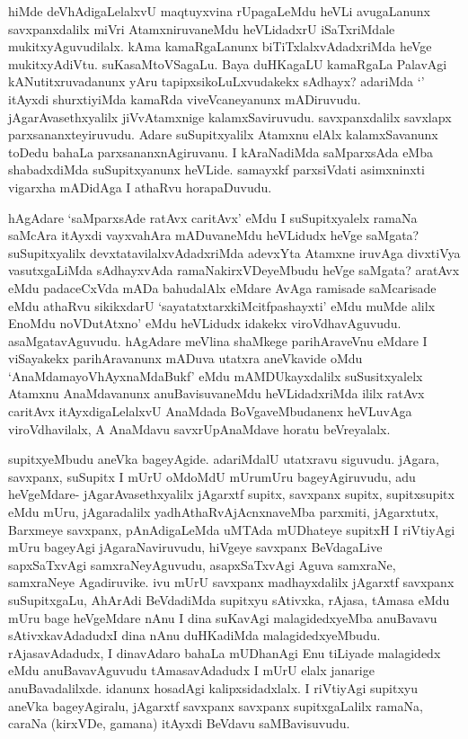 
\begin{artha}
hiMde deVhAdigaLelalxvU maqtuyxvina rUpagaLeMdu heVLi avugaLanunx savxpanxdalilx miVri AtamxniruvaneMdu heVLidadxrU iSaTxriMdale mukitxyAguvudilalx. kAma kamaRgaLanunx biTiTxlalxvAdadxriMda heVge mukitxyAdiVtu. suKasaMtoVSagaLu. Baya duHKagaLU kamaRgaLa PalavAgi kANutitxruvadanunx yAru tapipxsikoLuLxvudakekx sAdhayx? adariMda `\stext ' itAyxdi shurxtiyiMda kamaRda viveVcaneyanunx mADiruvudu. jAgarAvasethxyalilx jiVvAtamxnige kalamxSaviruvudu. savxpanxdalilx savxlapx parxsananxteyiruvudu. Adare suSupitxyalilx Atamxnu elAlx kalamxSavanunx toDedu bahaLa parxsananxnAgiruvanu. I kAraNadiMda saMparxsAda eMba shabadxdiMda suSupitxyanunx heVLide. samayxkf parxsiVdati asimxninxti vigarxha mADidAga I athaRvu horapaDuvudu. 
\end{artha}

\begin{artha}
hAgAdare `saMparxsAde ratAvx caritAvx' eMdu I suSupitxyalelx ramaNa saMcAra itAyxdi vayxvahAra mADuvaneMdu heVLidudx heVge saMgata? suSupitxyalilx devxtatavilalxvAdadxriMda adevxYta Atamxne iruvAga divxtiVya vasutxgaLiMda sAdhayxvAda ramaNakirxVDeyeMbudu heVge saMgata? aratAvx eMdu padaceCxVda mADa bahudalAlx eMdare AvAga ramisade saMcarisade eMdu athaRvu sikikxdarU `sayatatxtarxkiMcitfpashayxti' eMdu muMde alilx EnoMdu noVDutAtxno' eMdu heVLidudx idakekx viroVdhavAguvudu. asaMgatavAguvudu. hAgAdare meVlina shaMkege parihAraveVnu eMdare I viSayakekx parihAravanunx mADuva utatxra aneVkavide oMdu `AnaMdamayoVhAyxnaMdaBukf' eMdu mAMDUkayxdalilx suSusitxyalelx Atamxnu AnaMdavanunx anuBavisuvaneMdu heVLidadxriMda ililx ratAvx caritAvx itAyxdigaLelalxvU AnaMdada BoVgaveMbudanenx heVLuvAga viroVdhavilalx, A AnaMdavu savxrUpAnaMdave horatu beVreyalalx. 
\end{artha}%


\begin{artha}
supitxyeMbudu aneVka bageyAgide. adariMdalU utatxravu siguvudu. jAgara, savxpanx, suSupitx I mUrU oMdoMdU mUrumUru bageyAgiruvudu, adu heVgeMdare- jAgarAvasethxyalilx jAgarxtf supitx, savxpanx supitx, supitxsupitx eMdu mUru, jAgaradalilx yadhAthaRvAjAcnxnaveMba parxmiti, jAgarxtutx, Barxmeye savxpanx, pAnAdigaLeMda uMTAda mUDhateye supitxH I riVtiyAgi mUru bageyAgi jAgaraNaviruvudu, hiVgeye savxpanx BeVdagaLive sapxSaTxvAgi samxraNeyAguvudu, asapxSaTxvAgi Aguva samxraNe, samxraNeye Agadiruvike. ivu mUrU savxpanx madhayxdalilx jAgarxtf savxpanx suSupitxgaLu, AhArAdi BeVdadiMda supitxyu sAtivxka, rAjasa, tAmasa eMdu mUru bage heVgeMdare nAnu I dina suKavAgi malagidedxyeMba anuBavavu sAtivxkavAdadudxI dina nAnu duHKadiMda malagidedxyeMbudu. rAjasavAdadudx, I dinavAdaro bahaLa mUDhanAgi Enu tiLiyade malagidedx eMdu anuBavavAguvudu tAmasavAdadudx I mUrU elalx janarige anuBavadalilxde. idanunx hosadAgi kalipxsidadxlalx. I riVtiyAgi supitxyu aneVka bageyAgiralu, jAgarxtf savxpanx savxpanx supitxgaLalilx ramaNa, caraNa (kirxVDe, gamana) itAyxdi BeVdavu saMBavisuvudu.
\end{artha}

